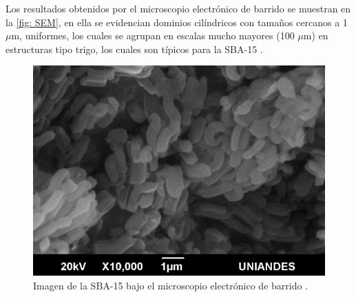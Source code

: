 \documentclass[fleqn, 12pt]{SelfArx}
\begin{document}
Los resultados obtenidos por el microscopio electr\'onico de barrido se muestran en la \autoref{fig: SEM}, en ella se evidencian dominios cil\'indricos con tama\~nos cercanos a 1 $\mu$m, uniformes, los cuales se agrupan en escalas mucho mayores (100 $\mu$m) en estructuras tipo trigo, los cuales son t\'ipicos para la SBA-15 \cite{zhao_1998}\cite{melendez_murillo_ramirez_2016}.
\begin{figure}[h]
    \centering
    \includegraphics[width=0.8\linewidth]{structures/SEM.png}
    \caption{Imagen de la SBA-15 bajo el microscopio electr\'onico de barrido \cite{melendez_murillo_ramirez_2016}.}
    \label{fig: SEM}
\end{figure}
\end{document}
